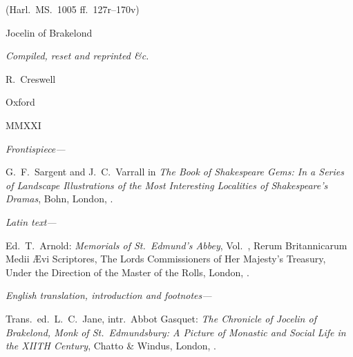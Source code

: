 \documentclass{book}
\begin{document}
{\begin{center}
{(Harl.\ MS.\ 1005 ff.\ 127r--170v)

Jocelin of Brakelond

\vspace*{5mm}

{\small \emph{Compiled, reset and reprinted \&c.}}

R.\ Creswell

Oxford

MMXXI

}

\end{center}

\vfill

{\setlength{\parskip}{1mm} \small

\emph{Frontispiece---}

G.\ F.\ Sargent and J.\ C.\ Varrall in \emph{The Book of Shakespeare Gems: In a Series of Landscape Illustrations of the Most Interesting Localities of Shakespeare's Dramas}, Bohn, London, .

\vspace{0.4cm}

\emph{Latin text---}

Ed.\ T.\ Arnold: \emph{Memorials of St.\ Edmund's Abbey}, Vol.\ , Rerum Britannicarum Medii \AE{}vi Scriptores, The Lords Commissioners of Her Majesty's Treasury, Under the Direction of the Master of the Rolls, London, .


\vspace{0.4cm}

\emph{English translation, introduction and footnotes---}

Trans.\ ed.\ L.\ C.\ Jane, intr.\ Abbot Gasquet: \emph{The Chronicle of Jocelin of Brakelond, Monk of St.\ Edmundsbury: A Picture of Monastic and Social Life in the XII{\tiny TH} Century}, Chatto \& Windus, London, .

}


\newpage

\thispagestyle{empty}
\begin{center}

\hspace{0pt}
\vfill

{

\parbox{5.5cm}{
}
}


\end{center}}
\end{document}
